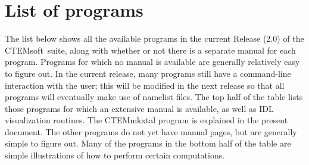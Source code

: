 \documentclass[DIV=calc, paper=letter, fontsize=11pt]{scrartcl}	 %
\newcommand{\ctp}{\textsf{CTEMsoft}}
\begin{document}
\section{List of programs}
The list below shows all the available programs in the current Release (2.0) of the \ctp\ suite, along with whether or not there is a 
separate manual for each program.  Programs for which no manual is available are generally relatively easy to figure out.
In the current release, many programs still have a command-line interaction with the user; this will be modified
in the next release so that all programs will eventually make use of namelist files.  The top half of the table
lists those programs for which an extensive manual is available, as well as IDL visualization routines. The \textsf{CTEMmkxtal}
program is explained in the present document.  The other programs do not yet have manual pages, but are generally 
simple to figure out.  Many of the programs in the bottom half of the table are simple illustrations of how 
to perform certain computations.

\end{document}

